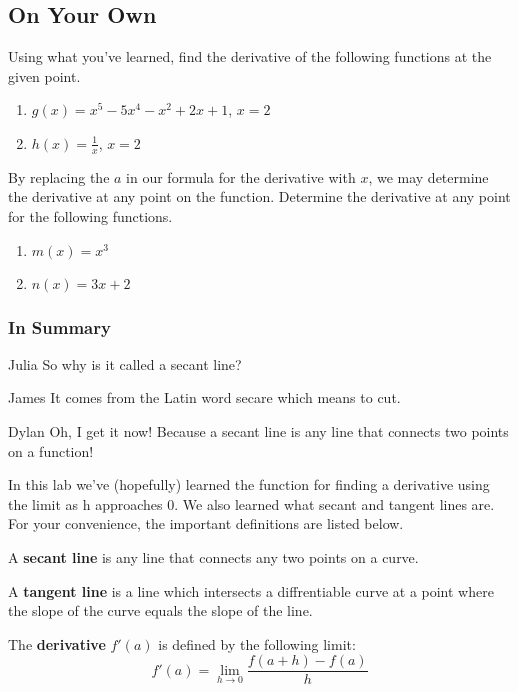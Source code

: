 \documentclass{ximera}
\theoremstyle{definition}
\begin{document}
\subsection{On Your Own}
Using what you've learned, find the derivative of the following functions at the given point.
\begin{enumerate}
\item{$g(x) = x^5-5x^4-x^2+2x+1$, $x=2$}
\item{$h(x) = \frac{1}{x}$, $x=2$}
\end{enumerate}
By replacing the $a$ in our formula for the derivative with $x$, we may determine the derivative at any point on the function. Determine the derivative at any point for the following functions.
\begin{enumerate}
\item{$m(x) = x^3$}
\item{$n(x) = 3x+2$}
\end{enumerate}


\subsubsection{In Summary}
\begin{dialogue}
\item[Julia] So why is it called a secant line?
\item[James] It comes from the Latin word secare which means to cut.
\item[Dylan] Oh, I get it now! Because a secant line is any line that connects two points on a function!
\end{dialogue}
In this lab we've (hopefully) learned the function for finding a derivative using the limit as h approaches 0. We also learned what secant and tangent lines are. For your convenience, the important definitions are listed below. 
\begin{definition}
 A \textbf{secant line} is any line that connects any two points on a curve.
\end{definition}
\begin{definition}
A \textbf{tangent line} is a line which intersects a diffrentiable curve at a point where the slope of the curve equals the slope of the line.
\end{definition}
\begin{definition}
The \textbf{derivative} $f'(a)$ is defined by the following limit:
$$f'(a)=\displaystyle \lim_{h\rightarrow 0} \frac{f(a+h)-f(a)}{h}$$
\end{definition}
\pagebreak
\end{document}
